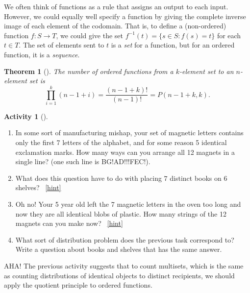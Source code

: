 \documentclass[10pt,]{book}
\theoremstyle{plain}
\newtheorem{theorem}{Theorem}[section]
\theoremstyle{definition}
\theoremstyle{definition}
\theoremstyle{definition}
\newtheorem{activity}[project]{Activity}
\numberwithin{equation}{chapter}
\def\inv{^{-1}}
\def\st{:}
\begin{document}
\par
\hypertarget{p-404}{}%
We often think of functions as a rule that assigns an output to each input.  However, we could equally well specify a function by giving the complete inverse image of each element of the codomain.  That is, to define a (non-ordered) function \(f:S \to T\), we could give the set \(f\inv(t) = \{s \in S \st f(s) = t\}\) for each \(t \in T\).  The set of elements sent to \(t\) is a \emph{set} for a function, but for an ordered function, it is a \emph{sequence}.%
\begin{theorem}[{}]\label{theorem-4}
\hypertarget{p-405}{}%
The number of ordered functions from a \(k\)-element set to an \(n\)-element set is%
\begin{equation*}
\prod_{i=1}^k (n-1+i) = \frac{(n-1+k)!}{(n-1)!} = P(n-1+k, k).
\end{equation*}
%
\end{theorem}
\begin{activity}[]\label{activity-63}
\leavevmode%
\begin{enumerate}[font=\bfseries,label=(\alph*),ref=\alph*]
\item\label{task-98} \hypertarget{p-406}{}%
In some sort of manufacturing mishap, your set of magnetic letters contains only the first 7 letters of the alphabet, and for some reason 5 identical exclamation marks.  How many ways can you arrange all 12 magnets in a single line?  (one such line is BG!AD!!!FEC!).%
\item\label{task-99} \hypertarget{p-409}{}%
What does this question have to do with placing \(7\) distinct books on \(6\) shelves?%
~\hfill{\tiny\hyperlink{a-63.b}{[hint]}\hypertarget{q-63.b}{}}\item\label{task-100} \hypertarget{p-413}{}%
Oh no! Your 5 year old left the 7 magnetic letters in the oven too long and now they are all identical blobs of plastic.  How many strings of the 12 magnets can you make now?%
~\hfill{\tiny\hyperlink{a-63.c}{[hint]}\hypertarget{q-63.c}{}}\item\label{task-101} \hypertarget{p-416}{}%
What sort of distribution problem does the previous task correspond to?  Write a question about books and shelves that has the same answer.%
\end{enumerate}
\end{activity}
\hypertarget{p-418}{}%
AHA!  The previous activity suggests that to count multisets, which is the same as counting distributions of identical objects to distinct recipients, we should apply the quotient principle to ordered functions.%
\end{document}

